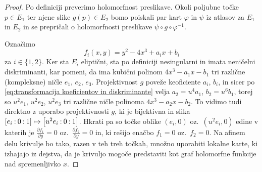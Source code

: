 \documentclass[mat1]{fmfdelo}
\numberwithin{equation}{section}
\newcommand{\inv}{^{-1}}
\newcommand{\pcoor}[1]{%
\begingroup\lccode`~=`: \lowercase{\endgroup
\edef~}{\mathbin{\mathchar\the\mathcode`:}\nobreak}%
\left[%
\begingroup
\mathcode`:=\string"8000
#1%
\endgroup
\right]%
}
\newcommand{\pdv}[2][]{\frac{\partial#1}{\partial#2}}
\newcommand{\oz}{oz.\ }
\theoremstyle{definition}
\begin{document}
\begin{proof}
    Po definiciji preverimo holomorfnost preslikave. Okoli poljubne točke $p \in E_1$ ter njene slike $g(p) \in E_2$ bomo poiskali par kart $\varphi$ in $\psi$ iz atlasov za $E_1$ in $E_2$ in se prepričali o holomorfnosti preslikave $\psi \circ g \circ \varphi\inv$. 
    
    Označimo 
    \[
        f_i(x, y) = y^2 - 4x^3 + a_ix + b_i
    \]
    za $i \in \{1,2\}$.
    Ker sta $E_i$ eliptični, sta po definiciji nesingularni in imata neničelni diskriminanti, kar pomeni, da ima kubični polinom $4x^3 - a_1x - b_1$ tri različne (kompleksne) ničle $e_1$, $e_2$, $e_3$. Projektivnost $g$ poveže keoficiente $a_i$, $b_i$, in sicer po \ref{eq:transformacija koeficientov in diskriminante} velja $a_2 = u^4 a_1$, $b_2 = u^6 b_1$, torej so $u^2e_1$, $u^2e_2$, $u^2e_3$ tri različne ničle polinoma $4x^3 - a_2x - b_2$. To vidimo tudi direktno z uporabo projektivnosti $g$, ki je bijektivna in slika $\pcoor{e_i : 0 : 1} \mapsto \pcoor{u^2 e_i : 0 : 1}$. Hkrati pa so točke oblike $(e_i, 0)$ \oz $(u^2 e_i, 0)$ edine v katerih je $\pdv[f_1]{y} = 0$ \oz $\pdv[f_2]{y} = 0$ in, ki rešijo enačbo $f_1 = 0$ \oz $f_2 = 0$. Na afinem delu krivulje bo tako, razen v teh treh točkah, množno uporabiti lokalne karte, ki izhajajo iz dejstva, da je krivuljo mogoče predstaviti kot graf holomorfne funkcije nad spremenljivko $x$. 
    

\end{proof}
\end{document}
